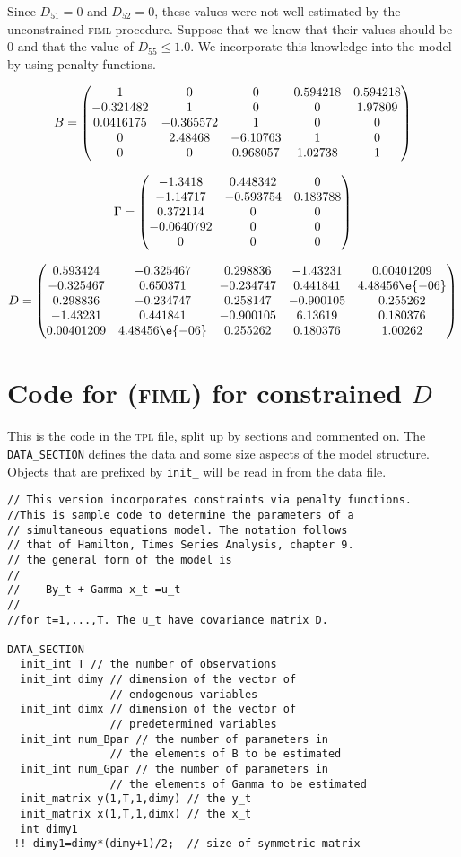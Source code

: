 Since $D_{51}=0$ and $D_{52}=0$, these values were not well 
estimated by the unconstrained \textsc{fiml} procedure. Suppose that
we know that their values should be $0$ and that the
value of $D_{55}\le1.0$. We incorporate this knowledge
into the model by using penalty functions. 

$$B=\begin{pmatrix}
1&0&0&0.594218&0.594218\cr
-0.321482&1&0&0&1.97809\cr
0.0416175&-0.365572&1&0&0\cr
0&2.48468&-6.10763&1&0\cr
0&0&0.968057&1.02738&1
\end{pmatrix}
$$

\bigskip
$$\Gamma=\begin{pmatrix}
-1.3418&0.448342&0\cr
-1.14717&-0.593754&0.183788\cr
0.372114&0&0\cr
-0.0640792&0&0\cr
0&0&0
\end{pmatrix}
$$

\bigskip
$$D=\begin{pmatrix}
0.593424&-0.325467&0.298836&-1.43231&0.00401209\cr
-0.325467&0.650371&-0.234747&0.441841&4.48456\e{-06}\cr
0.298836&-0.234747&0.258147&-0.900105&0.255262\cr
-1.43231&0.441841&-0.900105&6.13619&0.180376\cr
0.00401209&4.48456\e{-06}&0.255262&0.180376&1.00262
\end{pmatrix}
$$


\section{Code for (\textsc{fiml}) for constrained $D$} 

This is the code in the \textsc{tpl} file, split up by sections and
commented on. The \texttt{DATA\_SECTION} defines the data and some size
aspects of the model structure. Objects that are prefixed by \texttt{init\_}
will be read in from the data file.
\begin{lstlisting}
// This version incorporates constraints via penalty functions.
//This is sample code to determine the parameters of a
// simultaneous equations model. The notation follows
// that of Hamilton, Times Series Analysis, chapter 9.
// the general form of the model is
//
//    By_t + Gamma x_t =u_t
//
//for t=1,...,T. The u_t have covariance matrix D.

DATA_SECTION
  init_int T // the number of observations
  init_int dimy // dimension of the vector of 
                // endogenous variables
  init_int dimx // dimension of the vector of 
                // predetermined variables 
  init_int num_Bpar // the number of parameters in
                // the elements of B to be estimated 
  init_int num_Gpar // the number of parameters in
                // the elements of Gamma to be estimated 
  init_matrix y(1,T,1,dimy) // the y_t
  init_matrix x(1,T,1,dimx) // the x_t
  int dimy1
 !! dimy1=dimy*(dimy+1)/2;  // size of symmetric matrix
\end{lstlisting}


